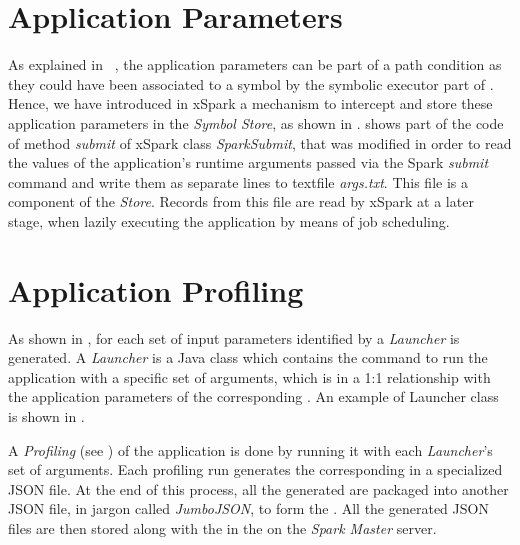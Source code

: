\section{Application Parameters}\label{sec:application_parameters}
As explained in ~, the application parameters can be part of a path condition as they could have been associated to a symbol by the symbolic executor part of \dSymb. Hence, we have introduced in xSpark a mechanism to intercept and store these application parameters in the \tool \textit{Symbol Store}, as shown in .   shows part of the code of method \textit{submit} of xSpark class \textit{SparkSubmit}, that was modified in order to read the values of the application's runtime arguments passed via the Spark \textit{submit} command and write them as separate lines to textfile \textit{args.txt}. This file is a component of the \textit{\model Store}. Records from this file are read by xSpark at a later stage, when lazily executing the application by means of job scheduling.
 


\section{Application Profiling}\label{sec:application_profiling}
As shown in , for each set of input parameters identified by \dSymb a \textit{Launcher} is generated. A \textit{Launcher} is a Java class which contains the command to run the application with a specific set of arguments, which is in a 1:1 relationship with the application parameters of the corresponding \plan. An example of Launcher class is shown in . 

A \textit{Profiling} (see ) of the application is done by running it with each \textit{Launcher}'s set of arguments. Each profiling run generates the corresponding \plan in a specialized JSON file. At the end of this process, all the generated \plans are packaged into another JSON file, in jargon called \textit{JumboJSON}, to form the \model. All the generated JSON files are then stored along with the \model in the \textit{} on the \textit{Spark Master} server. 



